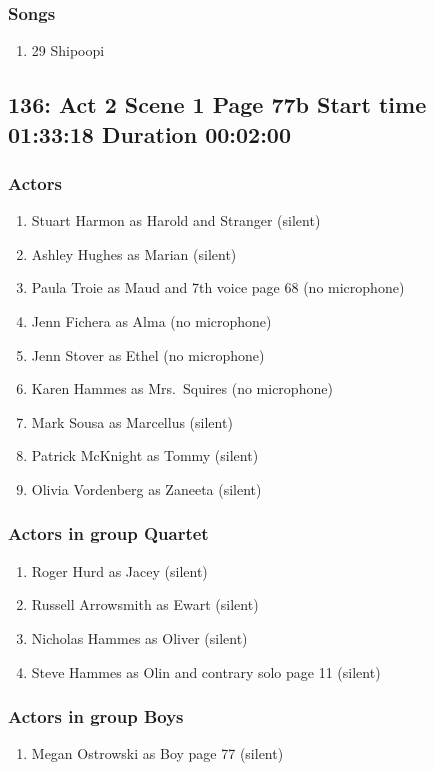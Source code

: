 \subsubsection{Songs}
\begin{enumerate}
\item 29 Shipoopi
\end{enumerate}
\subsection{136: Act 2 Scene 1 Page 77b Start time 01:33:18 Duration 00:02:00}

\subsubsection{Actors}
\begin{enumerate}
\item Stuart Harmon as Harold and Stranger (silent)
\item Ashley Hughes as Marian (silent)
\item Paula Troie as Maud and 7th voice page 68 (no microphone)
\item Jenn Fichera as Alma (no microphone)
\item Jenn Stover as Ethel (no microphone)
\item Karen Hammes as Mrs.~Squires (no microphone)
\item Mark Sousa as Marcellus (silent)
\item Patrick McKnight as Tommy (silent)
\item Olivia Vordenberg as Zaneeta (silent)
\end{enumerate}
\subsubsection{Actors in group Quartet}
\begin{enumerate}
\item Roger Hurd as Jacey (silent)
\item Russell Arrowsmith as Ewart (silent)
\item Nicholas Hammes as Oliver (silent)
\item Steve Hammes as Olin and contrary solo page 11 (silent)
\end{enumerate}
\subsubsection{Actors in group Boys}
\begin{enumerate}
\item Megan Ostrowski as Boy page 77 (silent)
\end{enumerate}

